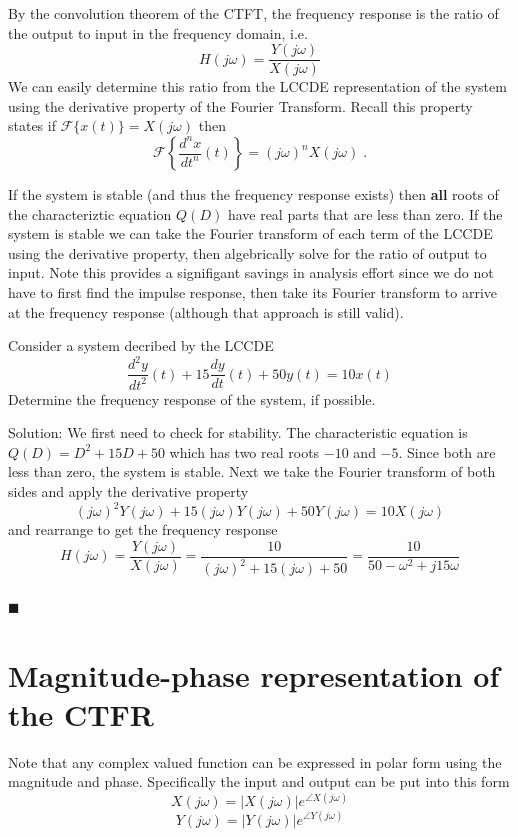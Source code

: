 By the convolution theorem of the CTFT, the frequency response is the ratio of the output to input in the frequency domain, i.e.
\[
H(j\omega) = \frac{Y(j\omega)}{X(j\omega)}
\]
We can easily determine this ratio from the LCCDE representation of the system using the derivative property of the Fourier Transform. Recall this property states if $\mathcal{F}\{x(t)\} = X(j\omega)$ then
\[
\mathcal{F}\left\{\frac{d^n x}{dt^n}(t) \right\} = (j\omega)^n  X(j\omega) \; .
\]

If the system is stable (and thus the frequency response exists) then \textbf{all} roots of the characteriztic equation $Q(D)$ have real parts that are less than zero. If the system is stable we can take the Fourier transform of each term of the LCCDE using the derivative property, then algebrically solve for the ratio of output to input. Note this provides a signifigant savings in analysis effort since we do not have to first find the impulse response, then take its Fourier transform to arrive at the frequency response (although that approach is still valid).

\begin{example} Consider a system decribed by the LCCDE
  \[
\frac{d^2y}{dt^2}(t) + 15\frac{dy}{dt}(t) + 50y(t) = 10x(t) 
  \]
  Determine the frequency response of the system, if possible.

  Solution: We first need to check for stability. The characteristic equation is $Q(D) = D^2 + 15D + 50$ which has two real roots $-10$ and $-5$. Since both are less than zero, the system is stable. Next we take the Fourier transform of both sides and apply the derivative property
  \[
  (j\omega)^2Y(j\omega) + 15(j\omega) Y(j\omega) + 50Y(j\omega) = 10X(j\omega)
  \]
  and rearrange to get the frequency response
  \[
  H(j\omega) = \frac{Y(j\omega)}{X(j\omega)} = \frac{10}{(j\omega)^2 + 15(j\omega) + 50} = \frac{10}{50-\omega^2 + j15\omega}
  \]\\
  $\blacksquare$
\end{example}

\section{Magnitude-phase representation of the CTFR}

Note that any complex valued function can be expressed in polar form using the magnitude and phase. Specifically the input and output can be put into this form
\[
X(j\omega) = |X(j\omega)|e^{\angle X(j\omega)}
\]
\[
Y(j\omega) = |Y(j\omega)|e^{\angle Y(j\omega)}
\]

